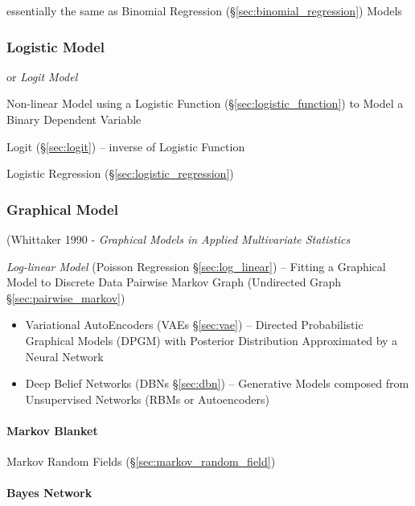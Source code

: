 essentially the same as Binomial Regression
(\S\ref{sec:binomial_regression}) Models



\subsubsection{Logistic Model}\label{sec:logistic_model}

or \emph{Logit Model}

Non-linear Model using a Logistic Function (\S\ref{sec:logistic_function}) to
Model a Binary Dependent Variable

Logit (\S\ref{sec:logit}) -- inverse of Logistic Function

Logistic Regression (\S\ref{sec:logistic_regression})



\subsubsection{Graphical Model}\label{sec:graphical_model}

(Whittaker 1990 - \emph{Graphical Models in Applied Multivariate Statistics}

\fist \emph{Log-linear Model} (Poisson Regression \S\ref{sec:log_linear}) --
Fitting a Graphical Model to Discrete Data \fist Pairwise Markov Graph
(Undirected Graph \S\ref{sec:pairwise_markov})

\begin{itemize}
  \item Variational AutoEncoders (VAEs \S\ref{sec:vae}) -- Directed
    Probabilistic Graphical Models (DPGM) with Posterior Distribution
    Approximated by a Neural Network
  \item Deep Belief Networks (DBNs \S\ref{sec:dbn}) -- Generative Models
    composed from Unsupervised Networks (RBMs or Autoencoders)
\end{itemize}



\paragraph{Markov Blanket}\label{sec:markov_blanket}\hfill

Markov Random Fields (\S\ref{sec:markov_random_field})



\paragraph{Bayes Network}\label{sec:bayes_network}\hfill

